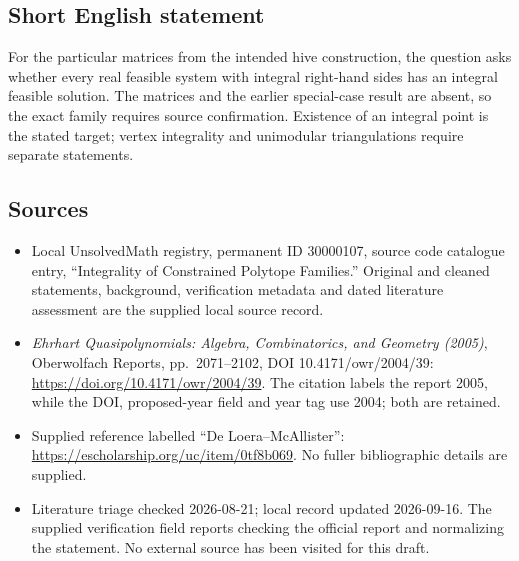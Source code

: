 \documentclass[11pt]{article}
\begin{document}
\subsection{Short English statement}
For the particular matrices from the intended hive construction, the question asks whether every real feasible system with integral right-hand sides has an integral feasible solution. The matrices and the earlier special-case result are absent, so the exact family requires source confirmation. Existence of an integral point is the stated target; vertex integrality and unimodular triangulations require separate statements.
\subsection{Sources}
\begin{itemize}
\item Local UnsolvedMath registry, permanent ID 30000107, source code catalogue entry, ``Integrality of Constrained Polytope Families.'' Original and cleaned statements, background, verification metadata and dated literature assessment are the supplied local source record.
\item \emph{Ehrhart Quasipolynomials: Algebra, Combinatorics, and Geometry (2005)}, Oberwolfach Reports, pp.\ 2071--2102, DOI 10.4171/owr/2004/39: \url{https://doi.org/10.4171/owr/2004/39}. The citation labels the report 2005, while the DOI, proposed-year field and year tag use 2004; both are retained.
\item Supplied reference labelled ``De Loera--McAllister'': \url{https://escholarship.org/uc/item/0tf8b069}. No fuller bibliographic details are supplied.
\item Literature triage checked 2026-08-21; local record updated 2026-09-16. The supplied verification field reports checking the official report and normalizing the statement. No external source has been visited for this draft.
\end{itemize}
\end{document}
